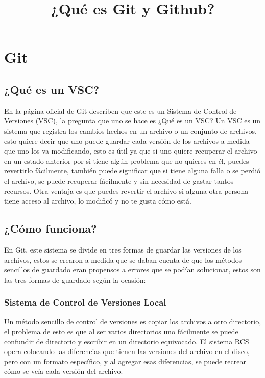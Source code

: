 \documentclass[conference]{IEEEtran}
\begin{document}
\title{¿Qué es Git y Github?\\}

\author{}

\maketitle

\section{Git}

\subsection{¿Qué es un VSC?}
En la página oficial de Git describen que este es un Sistema de Control de Versiones (VSC), la pregunta que uno se hace es ¿Qué es un VSC? Un VSC es un sistema que registra los cambios hechos en un archivo o un conjunto de archivos, esto quiere decir que uno puede guardar cada versión de los archivos a medida que uno los va modificando, esto es útil ya que si uno quiere recuperar el archivo en un estado anterior por si tiene algún problema que no quieres en él, puedes revertirlo fácilmente, también puede significar que si tiene alguna falla o se perdió el archivo, se puede recuperar fácilmente y sin necesidad de gastar tantos recursos. Otra ventaja es que puedes revertir el archivo si alguna otra persona tiene acceso al archivo, lo modificó y no te gusta cómo está.

\subsection{¿Cómo funciona?}
En Git, este sistema se divide en tres formas de guardar las versiones de los archivos, estos se crearon a medida que se daban cuenta de que los métodos sencillos de guardado eran propensos a errores que se podían solucionar, estos son las tres formas de guardado según la ocasión:

\subsubsection{Sistema de Control de Versiones Local}
Un método sencillo de control de versiones es copiar los archivos a otro directorio, el problema de esto es que al ser varios directorios uno fácilmente se puede confundir de directorio y escribir en un directorio equivocado. El sistema RCS opera colocando las diferencias que tienen las versiones del archivo en el disco, pero con un formato específico, y al agregar esas diferencias, se puede recrear cómo se veía cada versión del archivo.
\end{document}
